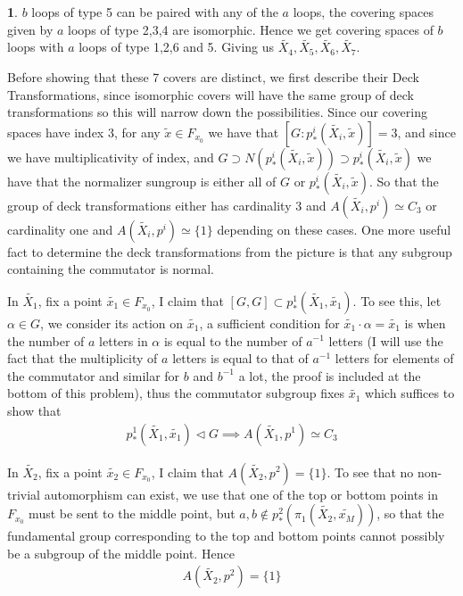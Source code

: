 \documentclass[10.5pt]{article}
\theoremstyle{definition}
\newtheorem{pb}{}
\newcommand{\set}[1]{\{#1\}}
\begin{document}
\begin{pb}
        \(b\) loops of type 5 can be paired with any of the \(a\) loops, the covering spaces given by \(a\) loops of type 2,3,4 are isomorphic. Hence we get covering spaces of \(b\) loops with \(a\) loops of type 1,2,6 and 5. Giving us \(\tilde{X_4},\tilde{X_5},\tilde{X_6},\tilde{X_7}\).

        Before showing that these 7 covers are distinct, we first describe their Deck Transformations, since isomorphic covers will have the same group of deck transformations so this will narrow down the possibilities. Since our covering spaces have index 3, for any \(\tilde{x} \in F_{x_0}\) we have that
        \([G:p^i_*(\tilde{X_i},\tilde{x})] = 3\), and since we have multiplicativity of index, and \(G \supset N(p^i_*(\tilde{X_i},\tilde{x})) \supset p^i_*(\tilde{X_i},\tilde{x})\) we have that the normalizer sungroup is either all of \(G\) or \(p^i_*(\tilde{X_i},\tilde{x})\). So that the group of deck transformations either has cardinality 3 and \(A(\tilde{X_i},p^i) \simeq C_3\) or cardinality one and \(A(\tilde{X_i},p^i) \simeq \set{1}\) depending on these cases. One more useful fact to determine the deck transformations from the picture is that any subgroup containing the commutator is normal.

        In \(\tilde{X_1}\), fix a point \(\tilde{x_1} \in F_{x_0}\), I claim that \([G,G] \subset p^1_*(\tilde{X_1},\tilde{x_1})\). To see this, let \(\alpha \in G\), we consider its action on \(\tilde{x_1}\), a sufficient condition for \(\tilde{x_1}\cdot \alpha = \tilde{x_1}\) is when the number of \(a\) letters in \(\alpha\) is equal to the number of \(a^{-1}\) letters (I will use the fact that the multiplicity of \(a\) letters is equal to that of \(a^{-1}\) letters for elements of the commutator and similar for \(b\) and \(b^{-1}\) a lot, the proof is included at the bottom of this problem), thus the commutator subgroup fixes \(\tilde{x_1}\) which suffices to show that
        \begin{align*}
            p^1_*(\tilde{X_1},\tilde{x_1}) \lhd G \implies A(\tilde{X_1},p^1) \simeq C_3
        \end{align*}

        In \(\tilde{X_2}\), fix a point \(\tilde{x_2} \in F_{x_0}\), I claim that \(A(\tilde{X_2},p^2) = \set{1}\). To see that no non-trivial automorphism can exist, we use that one of the top or bottom points in \(F_{x_0}\) must be sent to the middle point, but \(a,b \not \in p^2_*(\pi_1(\tilde{X_2},\tilde{x_M}))\), so that the fundamental group corresponding to the top and bottom points cannot possibly be a subgroup of the middle point. Hence
        \begin{align*}
            A(\tilde{X_2},p^2) = \set{1}
        \end{align*}


\end{pb}
\end{document}
